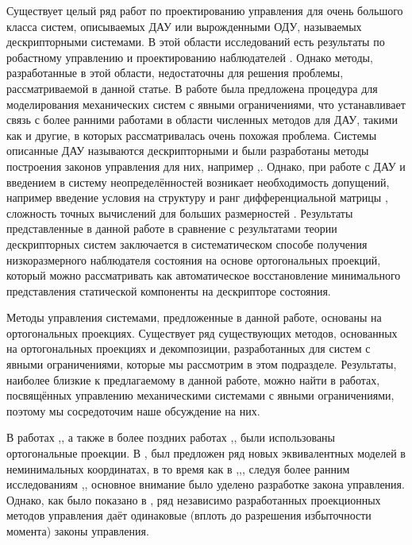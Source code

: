 Существует целый ряд работ по проектированию управления для очень большого класса систем, описываемых ДАУ или вырожденными ОДУ, называемых дескрипторными системами. В этой области исследований есть результаты по робастному управлению и проектированию наблюдателей \cite{Cheng2018, Darouach2014}. Однако методы, разработанные в этой области, недостаточны для решения проблемы, рассматриваемой в данной статье. В работе \cite{Aghili2003} была предложена процедура для моделирования механических систем с явными ограничениями, что устанавливает связь с более ранними работами в области численных методов для ДАУ, такими как \cite{Liang1987} и другие, в которых рассматривалась очень похожая проблема. Системы описанные ДАУ называются дескрипторными и были разработаны методы построения законов управления для них, например \cite{LIN19993319},\cite{Darouach2014}. Однако, при работе с ДАУ и введением в систему неопределённостей возникает необходимость допущений, например введение условия на структуру и ранг дифференциальной матрицы \cite{Cheng2017}, сложность точных вычислений для больших размерностей \cite{Zhang2006}. Результаты представленные в данной работе в сравнение с результатами теории дескрипторных систем заключается в систематическом способе получения низкоразмерного наблюдателя состояния на основе ортогональных проекций, который можно рассматривать как автоматическое восстановление минимального представления статической компоненты на дескрипторе состояния. 

Методы управления системами, предложенные в данной работе, основаны на ортогональных проекциях. Существует ряд существующих методов, основанных на ортогональных проекциях и декомпозиции, разработанных для систем с явными ограничениями, которые мы рассмотрим в этом подразделе. Результаты, наиболее близкие к предлагаемому в данной работе, можно найти в работах, посвящённых управлению механическими системами с явными ограничениями, поэтому мы сосредоточим наше обсуждение на них.

В работах \cite{Aghili2003},\cite{Aghili2005}, а также в более поздних работах \cite{Mistry2010},\cite{Righetti2011},\cite{Righetti2013} были использованы ортогональные проекции. В \cite{Aghili2003},\cite{Aghili2005} был предложен ряд новых эквивалентных моделей в неминимальных координатах, в то время как в \cite{Mistry2010},\cite{Righetti2011},\cite{Righetti2013}, следуя более ранним исследованиям \cite{Khatib2007},\cite{Sentis2005}, основное внимание было уделено разработке закона управления. Однако, как было показано в \cite{Righetti2011}, ряд независимо разработанных проекционных методов управления даёт одинаковые (вплоть до разрешения избыточности момента) законы управления.

